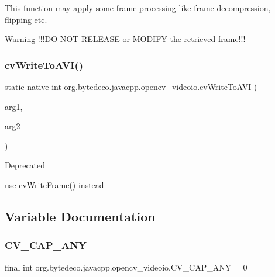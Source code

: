 This function may apply some frame processing like frame decompression, flipping etc. \begin{DoxyWarning}{Warning}
!!!\+DO N\+OT R\+E\+L\+E\+A\+SE or M\+O\+D\+I\+FY the retrieved frame!!! 
\end{DoxyWarning}
\mbox{\label{group__videoio__c_ga3f795024cbed8966f3b006b1ccd99acc}} 
\subsubsection{\texorpdfstring{cv\+Write\+To\+A\+V\+I()}{cvWriteToAVI()}}
{\footnotesize\ttfamily static native int org.\+bytedeco.\+javacpp.\+opencv\+\_\+videoio.\+cv\+Write\+To\+A\+VI (\begin{DoxyParamCaption}\item[{Cv\+Video\+Writer}]{arg1,  }\item[{Ipl\+Image}]{arg2 }\end{DoxyParamCaption})\hspace{0.3cm}{\ttfamily [static]}}

\begin{DoxyRefDesc}{Deprecated}
\item[\hyperlink{deprecated__deprecated000005}{Deprecated}]use \hyperlink{group__videoio__c_ga167c75eb3f3ce8ddde13d364bb6fa69d}{cv\+Write\+Frame()} instead \end{DoxyRefDesc}


\subsection{Variable Documentation}
\mbox{\label{group__videoio__c_gab170df7f9f17e64c3642fbc2036c9d89}} 
\subsubsection{\texorpdfstring{C\+V\+\_\+\+C\+A\+P\+\_\+\+A\+NY}{CV\_CAP\_ANY}}
{\footnotesize\ttfamily final int org.\+bytedeco.\+javacpp.\+opencv\+\_\+videoio.\+C\+V\+\_\+\+C\+A\+P\+\_\+\+A\+NY = 0\hspace{0.3cm}{\ttfamily [static]}}

